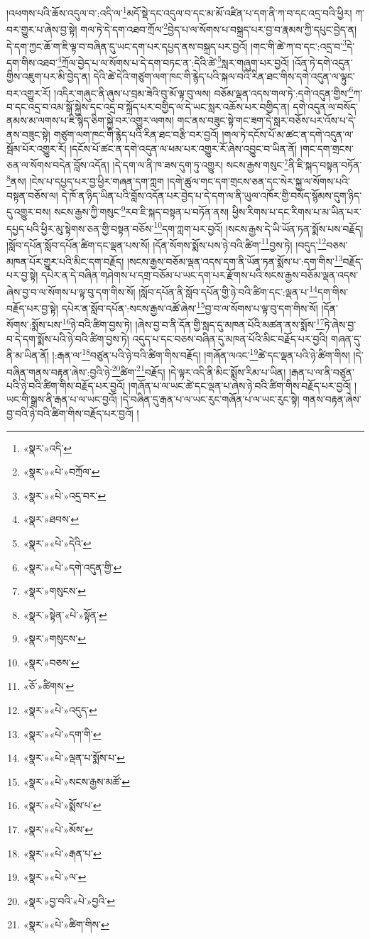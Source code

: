 །འཕགས་པའི་ཆོས་འདུལ་བ་:འདི་ལ་\footnote{«སྣར་»འདི་}མདོ་སྡེ་དང་འདུལ་བ་དང་མ་མོ་འཛིན་པ་དག་ནི་ཀ་བ་དང་འདྲ་བའི་ཕྱིར། ཀ་བར་གྱུར་པ་ཞེས་བྱ་སྟེ། གལ་ཏེ་དེ་དག་འཐབ་ཀྲོལ་\footnote{«སྣར་»«པེ་»བཀྲོལ་}བྱེད་པ་ལ་སོགས་པ་བསྐྲད་པར་བྱ་བ་རྣམས་ཀྱི་དཔུང་བྱེད་ན། དེ་དག་ཀྱང་ཆོ་ག་ཇི་ལྟ་བ་བཞིན་དུ་ཡང་དག་པར་དཔྱད་ནས་བསྐྲད་པར་བྱའོ། །གང་གི་ཚེ་ཀ་བ་དང་:འདྲ་བ་\footnote{«སྣར་»«པེ་»འདྲ་བར་}དེ་དག་གིས་འཐབ་\footnote{«སྣར་»ཐབས་}ཀྲོལ་བྱེད་པ་ལ་སོགས་པ་དེ་དག་བཏང་ན་:དེའི་ཚེ་\footnote{«སྣར་»«པེ་»དེའི་}སླར་གཞུག་པར་བྱའོ། །འོན་ཏེ་དགེ་འདུན་གྱིས་འཇུག་པར་མི་བྱེད་ན། དེའི་ཚེ་དེའི་གཙུག་ལག་ཁང་གི་རྙེད་པའི་སྐལ་བའི་རིན་ཐང་གིས་དགེ་འདུན་ལ་ལྟུང་བར་འགྱུར་རོ། །འདིར་གཞུང་ནི་ཞུས་པ་བྲམ་ཟེའི་བུ་མོ་ལྟ་བུ་ལས། བཅོམ་ལྡན་འདས་གལ་ཏེ་:དགེ་འདུན་གྱིས་\footnote{«སྣར་»«པེ་»དགེ་འདུན་གྱི་}ཀ་བ་དང་འདྲ་བ་འམ་སྒོ་སྐྱེས་དང་འདྲ་བ་སྐྲོད་པར་བགྱིད་ལ་དེ་ཡང་སླར་འཆོས་པར་བགྱིད་ན། དགེ་འདུན་ལ་བསོད་ནམས་མ་ལགས་པ་ཇི་སྙེད་ཅིག་སྐྱེ་བར་འགྱུར་ལགས། གང་ནས་བཟུང་སྟེ་གང་ཟག་དེ་སླར་བཅོས་པར་འོས་པ་དེ་ནས་བཟུང་སྟེ། གཙུག་ལག་ཁང་གི་རྙེད་པའི་རིན་ཐང་བརྩི་བར་བྱའོ། །གལ་ཏེ་དངོས་པོ་མ་ཚང་ན་དགེ་འདུན་ལ་སྦོམ་པོར་འགྱུར་རོ། །དངོས་པོ་ཚང་ན་དགེ་འདུན་ལ་ཕམ་པར་འགྱུར་རོ་ཞེས་འབྱུང་བ་ཡིན་ནོ། །གང་དག་གྲངས་ཅན་ལ་སོགས་བདེན་བློས་འདོན། །དེ་དག་ལ་ནི་ཁ་ཟས་དུག་ཏུ་འགྱུར། སངས་རྒྱས་གསུང་\footnote{«སྣར་»གསུངས་}ནི་ཇི་སྐད་བསྟན་བཏོན་\footnote{«སྣར་»སྟེན་«པེ་»སྟོན་}ནས། །ངེས་པ་དཔྱད་པར་བྱ་ཕྱིར་གཞན་དག་ཀླག །དགེ་ཚུལ་གང་དག་གྲངས་ཅན་དང་སེར་སྐྱ་ལ་སོགས་པའི་བསྟན་བཅོས་ལ། དེ་ཁོ་ན་ཉིད་ཡིན་པའི་བློས་འདོན་པར་བྱེད་པ་དེ་དག་ལ་ནི་ཡུལ་འཁོར་གྱི་བསོད་སྙོམས་དུག་ཉིད་དུ་འགྱུར་བས། སངས་རྒྱས་ཀྱི་གསུང་\footnote{«སྣར་»གསུངས་}རབ་ཇི་སྐད་བསྟན་པ་བཏོན་ནས། ཕྱིས་རིགས་པ་དང་རིགས་པ་མ་ཡིན་པར་དཔྱད་པའི་ཕྱིར་མུ་སྟེགས་ཅན་གྱི་བསྟན་བཅོས་\footnote{«སྣར་»བཅས་}དག་ཀླག་པར་བྱའོ། །སངས་རྒྱས་དེ་ཡི་ཡོན་ཏན་སྨོས་པས་བརྗོད། །སློབ་དཔོན་སློབ་དཔོན་ཚིག་དང་ལྡན་པས་སོ། །དོན་སོགས་སྨོས་པས་ཉེ་བའི་ཚིག་\footnote{«ཅོ་»ཚིགས་}བྱས་ཏེ། །བདུད་\footnote{«སྣར་»«པེ་»འདུད་}བཅས་མཁན་པོར་གྱུར་པའི་མིང་དག་བརྗོད། །སངས་རྒྱས་བཅོམ་ལྡན་འདས་དག་ནི་ཡོན་ཏན་སྨོས་པ་:དག་གིས་\footnote{«སྣར་»«པེ་»དག་གི་}བརྗོད་པར་བྱ་སྟེ། དཔེར་ན་དེ་བཞིན་གཤེགས་པ་དགྲ་བཅོམ་པ་ཡང་དག་པར་རྫོགས་པའི་སངས་རྒྱས་བཅོམ་ལྡན་འདས་ཞེས་བྱ་བ་ལ་སོགས་པ་ལྟ་བུ་དག་གིས་སོ། །སློབ་དཔོན་ནི་སློབ་དཔོན་གྱི་ཉེ་བའི་ཚིག་དང་:ལྡན་པ་\footnote{«སྣར་»«པེ་»ལྡན་པ་སྨོས་པ་}དག་གིས་བརྗོད་པར་བྱ་སྟེ། དཔེར་ན་སློབ་དཔོན་:སངས་རྒྱས་འཚོ་ཞེས་\footnote{«སྣར་»«པེ་»སངས་རྒྱས་མཚོ་}བྱ་བ་ལ་སོགས་པ་ལྟ་བུ་དག་གིས་སོ། །དོན་སོགས་:སྨོས་པས་\footnote{«སྣར་»«པེ་»སྨོས་པ་}ཉེ་བའི་ཚིག་བྱས་ཏེ། །ཞེས་བྱ་བ་ནི་དོན་གྱི་སླད་དུ་མཁན་པོའི་མཚན་ནས་སྨོས་\footnote{«སྣར་»«པེ་»མོས་}ཏེ་ཞེས་བྱ་བ་དེ་དག་སྨོས་པའི་ཉེ་བའི་ཚིག་བྱས་ཏེ། འདུད་པ་དང་བཅས་བཞིན་དུ་མཁན་པོའི་མིང་བརྗོད་པར་བྱའི། གཞན་དུ་ནི་མ་ཡིན་ནོ། །:རྒན་ལ་\footnote{«སྣར་»«པེ་»རྒན་པ་}བཙུན་པའི་ཉེ་བའི་ཚིག་གིས་བརྗོད། །གཞོན་ལའང་\footnote{«སྣར་»«པེ་»ལ་}ཚེ་དང་ལྡན་པའི་ཉེ་ཚིག་གིས། །དེ་བཞིན་གནས་བརྟན་ཞེས་:བྱའི་ཉེ་\footnote{«སྣར་»བྱ་བའི་«པེ་»བྱའི་}ཚིག་\footnote{«སྣར་»«པེ་»ཚིག་གིས་}བརྗོད། །དེ་ལྟར་འདི་ནི་མིང་སྨོས་རིམ་པ་ཡིན། །རྒན་པ་ལ་ནི་བཙུན་པའི་ཉེ་བའི་ཚིག་གིས་བརྗོད་པར་བྱའོ། །གཞོན་པ་ལ་ཡང་ཚེ་དང་ལྡན་པ་ཞེས་ཉེ་བའི་ཚིག་གིས་བརྗོད་པར་བྱའོ། །ཡང་གི་སྒྲས་ནི་རྒན་པ་ལ་ཡང་བྱའོ། །དེ་བཞིན་དུ་རྒན་པ་ལ་ཡང་རུང་གཞོན་པ་ལ་ཡང་རུང་སྟེ། གནས་བརྟན་ཞེས་བྱ་བའི་ཉེ་བའི་ཚིག་གིས་བརྗོད་པར་བྱའོ། །
